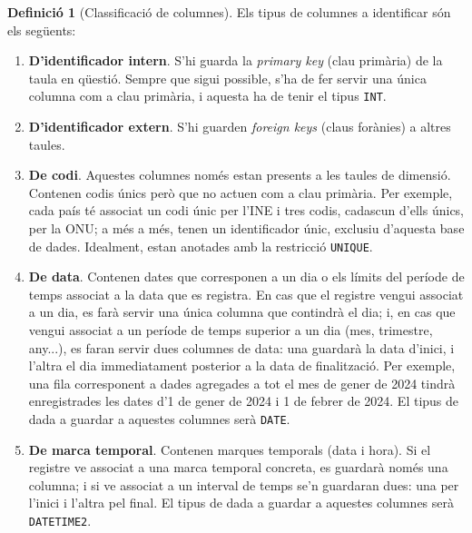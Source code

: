 \documentclass{article}
\theoremstyle{definition}
\newtheorem{definition}{Definició}
\begin{document}
\begin{definition}[Classificació de columnes]\label{def:columns:classification}
  Els tipus de columnes a identificar són els següents:
  \begin{enumerate}
    \item \textbf{D'identificador intern}. S'hi guarda la \emph{primary key} (clau primària) de la taula en qüestió. Sempre que sigui possible, s'ha de fer servir una única columna com a clau primària, i aquesta ha de tenir el tipus \verb|INT|.

    \item \textbf{D'identificador extern}. S'hi guarden \emph{foreign keys} (claus forànies) a altres taules.

    \item \textbf{De codi}. Aquestes columnes només estan presents a les taules de dimensió. Contenen codis únics però que no actuen com a clau primària. Per exemple, cada país té associat un codi únic per l'INE i tres codis, cadascun d'ells únics, per la ONU; a més a més, tenen un identificador únic, exclusiu d'aquesta base de dades. Idealment, estan anotades amb la restricció \verb|UNIQUE|.

    \item \textbf{De data}. Contenen dates que corresponen a un dia o els límits del període de temps associat a la data que es registra. En cas que el registre vengui associat a un dia, es farà servir una única columna que contindrà el dia; i, en cas que vengui associat a un període de temps superior a un dia (mes, trimestre, any...), es faran servir dues columnes de data: una guardarà la data d'inici, i l'altra el dia immediatament posterior a la data de finalització. Per exemple, una fila corresponent a dades agregades a tot el mes de gener de 2024 tindrà enregistrades les dates d'1 de gener de 2024 i 1 de febrer de 2024. El tipus de dada a guardar a aquestes columnes serà \verb|DATE|.

    \item \textbf{De marca temporal}. Contenen marques temporals (data i hora). Si el registre ve associat a una marca temporal concreta, es guardarà només una columna; i si ve associat a un interval de temps se'n guardaran dues: una per l'inici i l'altra pel final. El tipus de dada a guardar a aquestes columnes serà \verb|DATETIME2|.


\end{enumerate}
\end{definition}
\end{document}

